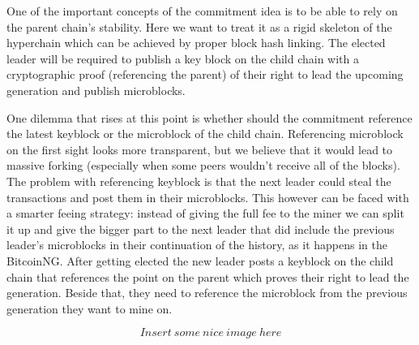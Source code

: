 One of the important concepts of the commitment idea is to be able to rely on
the parent chain's stability. Here we want to treat it as a rigid skeleton
of the hyperchain which can be achieved by proper block hash linking. The
elected leader will be required to publish a key block on the child chain with a
cryptographic proof (referencing the parent) of their right to lead the
upcoming generation and publish microblocks.

One dilemma that rises at this point is whether should the commitment reference
the latest keyblock or the microblock of the child chain. Referencing microblock
on the first sight looks more transparent, but we believe that it would
lead to massive forking (especially when some peers wouldn't receive all of the
blocks). The problem with referencing keyblock is that the next leader could
steal the transactions and post them in their microblocks. This however can be
faced with a smarter feeing strategy: instead of giving the full fee to the
miner we can split it up and give the bigger part to the next leader that did
include the previous leader's microblocks in their continuation of the history,
as it happens in the BitcoinNG\cite{incentive_bcng}.
After getting elected the new leader posts a keyblock on the child chain that
references the point on the parent which proves their right to lead the
generation. Beside that, they need to reference the microblock from the previous
generation they want to mine on.

$$Insert\ some\ nice\ image\ here$$


